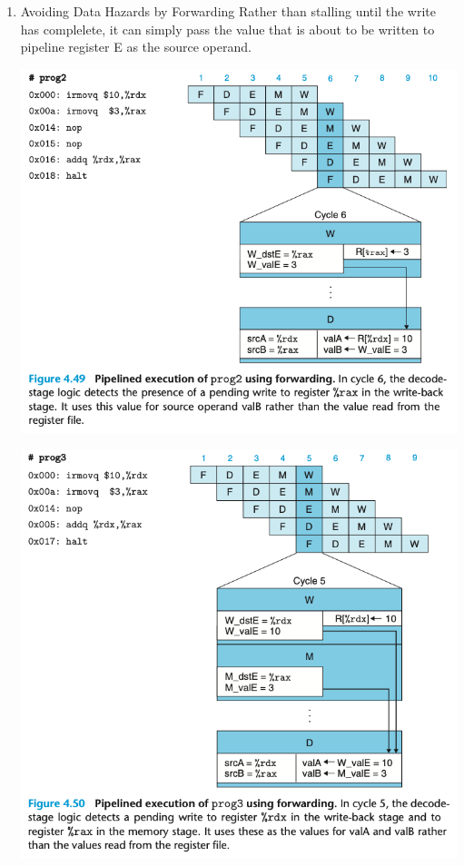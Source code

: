 \documentclass[11pt]{article}
\begin{document}
\begin{enumerate}
\item Avoiding Data Hazards by Forwarding
\label{sec:org7087646}
Rather than stalling until the write has complelete, it can simply pass the value that is about to be written to pipeline register E as the source operand.\\

\begin{center}
\includegraphics[width=.9\linewidth]{pics/figure4.49.png}
\end{center}

\begin{center}
\includegraphics[width=.9\linewidth]{pics/figure4.50.png}
\end{center}


\end{enumerate}
\end{document}
